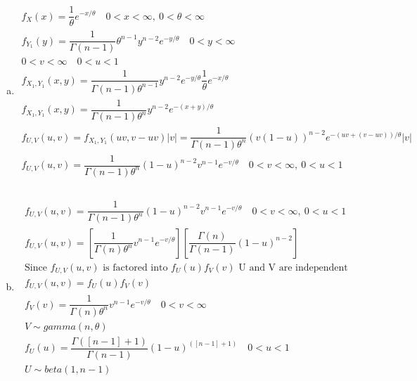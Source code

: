 \documentclass{article}
\begin{document}
\begin{flushleft}
\begin{enumerate}[(a)]
	\item 
\begin{multline*}\\
f_X(x)=\dfrac{1}{\theta}e^{-x/\theta} \quad 0<x<\infty, \ 0<\theta<\infty\\
f_{Y_1}(y)=\dfrac{1}{\Gamma(n-1)}\theta^{n-1}y^{n-2}e^{-y/\theta} \quad 0<y<\infty\\
0<v<\infty \quad 0<u<1 \\
f_{X_1,Y_1}(x,y)=\dfrac{1}{\Gamma(n-1)\theta^{n-1}}y^{n-2}e^{-y/\theta}\dfrac{1}{\theta}e^{-x/\theta}\\
f_{X_1,Y_1}(x,y)=\dfrac{1}{\Gamma(n-1)\theta^{n}}y^{n-2}e^{-(x+y)/\theta}\\
f_{U,V}(u,v)=f_{X_1,Y_1}(uv,v-uv)|v|=\dfrac{1}{\Gamma(n-1)\theta^{n}}{(v(1-u))}^{n-2}e^{-(uv+(v-uv))/\theta}|v|\\
f_{U,V}(u,v)=\dfrac{1}{\Gamma(n-1)\theta^{n}}{(1-u)}^{n-2}v^{n-1}e^{-v/\theta} \quad 0<v<\infty, \ 0<u<1\\
\end{multline*}
\pagebreak
	\item 
\begin{multline*}\\
f_{U,V}(u,v)=\dfrac{1}{\Gamma(n-1)\theta^{n}}{(1-u)}^{n-2}v^{n-1}e^{-v/\theta} \quad 0<v<\infty, \ 0<u<1\\
f_{U,V}(u,v)=\left[\dfrac{1}{\Gamma(n)\theta^{n}}v^{n-1}e^{-v/\theta}\right]\left[\dfrac{\Gamma(n)}{\Gamma(n-1)}{(1-u)}^{n-2}\right]\\
\text{Since } f_{U,V}(u,v) \text{ is factored into } f_U(u)f_V(v) \text{ U and V are independent}\\
f_{U,V}(u,v)=f_U(u)f_V(v)\\
f_V(v)=\dfrac{1}{\Gamma(n)\theta^{n}}v^{n-1}e^{-v/\theta} \quad 0<v<\infty\\
V\sim gamma(n,\theta)\\
f_U(u)=\dfrac{\Gamma([n-1]+1)}{\Gamma(n-1)}{(1-u)}^{([n-1]+1)} \quad 0<u<1\\
U\sim beta(1,n-1)\\
\end{multline*}


\end{enumerate}
\end{flushleft}
\end{document}
